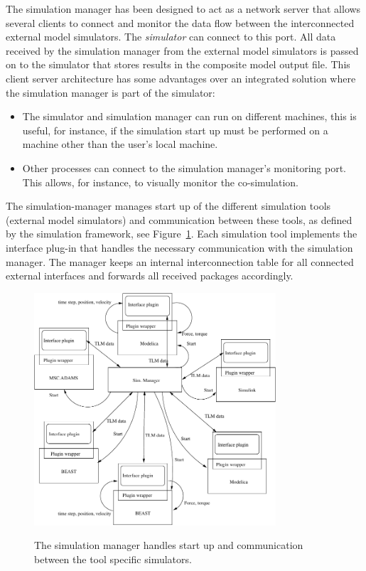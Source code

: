 The simulation manager has been designed to act as a network server that allows several clients to connect and monitor the data flow between the interconnected external model simulators. 
The {\em simulator} can connect to this port. 
All data received by the simulation manager from the external model simulators is passed on to the simulator that stores results in the composite model output file.  
This client server architecture has some advantages over an integrated solution where the simulation manager is part of the simulator:
\begin{itemize}
\item The simulator and simulation manager can run on different machines, this is useful, for instance, if the simulation start up must	be performed on a machine other than the user's local machine.
\item Other processes can connect to the simulation manager's monitoring port. 
This allows, for instance, to visually monitor the co-simulation.
\end{itemize}

\noindent The simulation-manager manages start up of the different simulation tools (external model simulators) and communication between these tools, as defined by the simulation framework, see Figure~\ref{fig:MMSystem}. 
Each simulation tool implements the interface plug-in that handles the necessary communication with the simulation manager. 
The manager keeps an internal interconnection table for all connected external interfaces and forwards all received packages accordingly.

\begin{figure}[ht]\begin{center}
%    
   {\includegraphics[width=9cm]{figs/TLM_system.pdf}}
    \caption{The simulation manager handles start up and communication between the tool specific simulators.}
    \label{fig:MMSystem}
\end{center}\end{figure}

